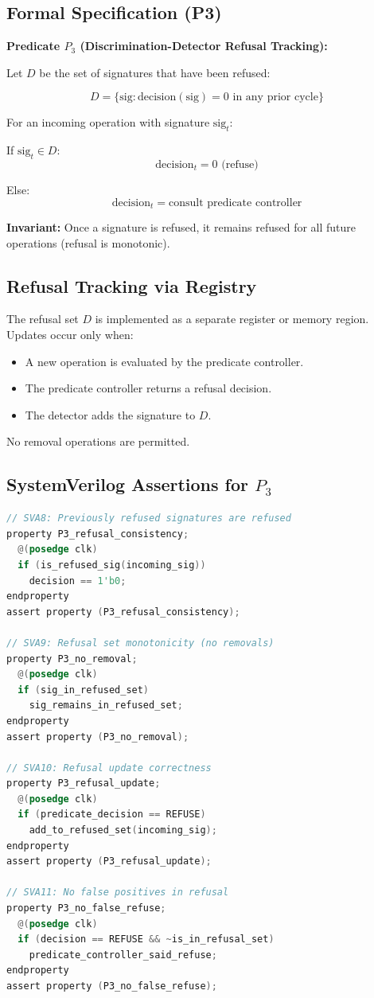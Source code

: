 \documentclass[11pt,oneside]{article}
\begin{document}
\subsection{Formal Specification (P3)}

\begin{boxed}
\textbf{Predicate $P_3$ (Discrimination-Detector Refusal Tracking):}

Let $D$ be the set of signatures that have been refused:

\[
D = \{\text{sig} : \text{decision}(\text{sig}) = 0 \text{ in any prior cycle}\}
\]

For an incoming operation with signature $\text{sig}_t$:

If $\text{sig}_t \in D$:
\[
\text{decision}_t = 0 \text{ (refuse)}
\]

Else:
\[
\text{decision}_t = \text{consult predicate controller}
\]

\textbf{Invariant:} Once a signature is refused, it remains refused for all future operations (refusal is monotonic).
\end{boxed}

\subsection{Refusal Tracking via Registry}

The refusal set $D$ is implemented as a separate register or memory region. Updates occur only when:
\begin{itemize}
\item A new operation is evaluated by the predicate controller.
\item The predicate controller returns a refusal decision.
\item The detector adds the signature to $D$.
\end{itemize}

No removal operations are permitted.

\subsection{SystemVerilog Assertions for $P_3$}

\begin{lstlisting}[language=Verilog]
// SVA8: Previously refused signatures are refused
property P3_refusal_consistency;
  @(posedge clk)
  if (is_refused_sig(incoming_sig))
    decision == 1'b0;
endproperty
assert property (P3_refusal_consistency);

// SVA9: Refusal set monotonicity (no removals)
property P3_no_removal;
  @(posedge clk)
  if (sig_in_refused_set)
    sig_remains_in_refused_set;
endproperty
assert property (P3_no_removal);

// SVA10: Refusal update correctness
property P3_refusal_update;
  @(posedge clk)
  if (predicate_decision == REFUSE)
    add_to_refused_set(incoming_sig);
endproperty
assert property (P3_refusal_update);

// SVA11: No false positives in refusal
property P3_no_false_refuse;
  @(posedge clk)
  if (decision == REFUSE && ~is_in_refusal_set)
    predicate_controller_said_refuse;
endproperty
assert property (P3_no_false_refuse);
\end{lstlisting}
\end{document}

